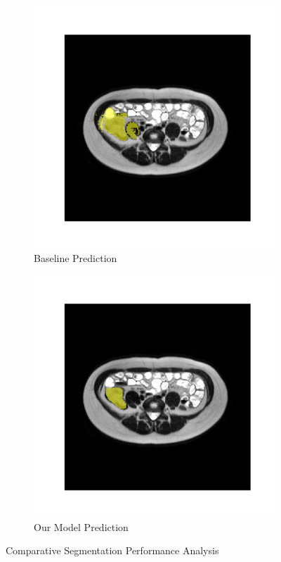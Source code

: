 \begin{figure}[htp]
\begin{subfigure}[b]{0.47\textwidth}
\includegraphics[width=\textwidth]{./figures/seg_baseline.png}
\caption{Baseline Prediction}
\label{fig:baseline-pred}
\end{subfigure}
\hfill
\begin{subfigure}[b]{0.47\textwidth}
\centering
\includegraphics[width=\textwidth]{./figures/seg_medsam.png}
\caption{Our Model Prediction}
\label{fig:medsam-pred}
\end{subfigure}
\caption{Comparative Segmentation Performance Analysis}
\label{fig:comparison-pred}
\end{figure}

